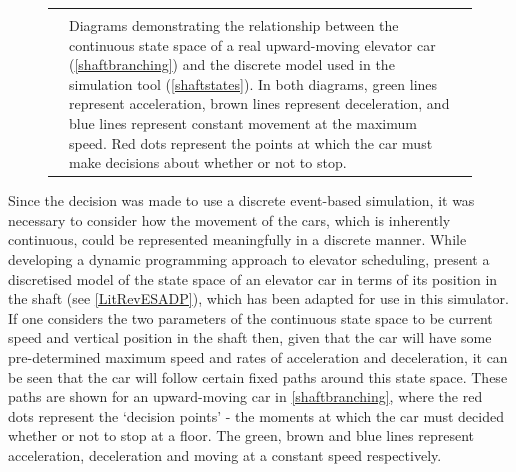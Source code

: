 \documentclass{UoYCSproject}
\begin{document}
\begin{figure} [h]
\begin{minipage}[t]{.46\textwidth}
		\label{shaftstates}
	\end{minipage}
	\begin{tabularx}{\linewidth}{l X l}
	 & & \\
	 & Diagrams demonstrating the relationship between the continuous state space of a real upward-moving elevator car (\autoref{shaftbranching}) and the discrete model used in the simulation tool (\autoref{shaftstates}).  In both diagrams, green lines represent acceleration, brown lines represent deceleration, and blue lines represent constant movement at the maximum speed.  Red dots represent the points at which the car must make decisions about whether or not to stop. & 
	\end{tabularx}
\end{figure}

Since the decision was made to use a discrete event-based simulation, it was necessary to consider how the movement of the cars, which is inherently continuous, could be represented meaningfully in a discrete manner.  While developing a dynamic programming approach to elevator scheduling, \citet{Nikovski2003} present a discretised model of the state space of an elevator car in terms of its position in the shaft (see \autoref{LitRevESADP}), which has been adapted for use in this simulator.  If one considers the two parameters of the continuous state space to be current speed and vertical position in the shaft then, given that the car will have some pre-determined maximum speed and rates of acceleration and deceleration, it can be seen that the car will follow certain fixed paths around this state space.  These paths are shown for an upward-moving car in \autoref{shaftbranching}, where the red dots represent the `decision points' - the moments at which the car must decided whether or not to stop at a floor.  The green, brown and blue lines represent acceleration, deceleration and moving at a constant speed respectively.
\end{document}
